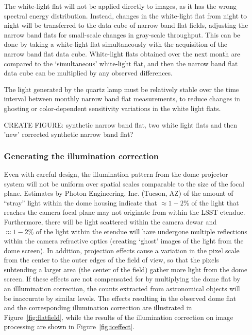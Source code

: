 \documentclass[12pt,preprint]{aastex}
\begin{document}
The white-light flat will not be applied directly to images, as it has
the wrong spectral energy distribution. Instead, changes in the
white-light flat from night to night will be transferred to the data
cube of narrow band flat fields, adjusting the narrow band flats for
small-scale changes in gray-scale throughput. This can be done by taking a
white-light flat simultaneously with the acquisition of the narrow
band flat data cube. White-light flats obtained over the next month
are compared to the `simultaneous' white-light flat, and then the
narrow band flat data cube can be multiplied by any observed differences.

The light generated by the quartz lamp must be relatively stable over
the time interval between monthly narrow band flat measurements, to
reduce changes in ghosting or color-dependent sensitivity variations
in the white light flats.

CREATE FIGURE: synthetic narrow band flat, two white light flats and then 'new'
corrected synthetic narrow band flat?

\subsubsection{Generating the illumination correction}

Even with careful design, the illumination pattern from the dome
projector system will not be uniform over spatial scales comparable to
the size of the focal plane. Estimates by Photon Engineering,
Inc. (Tucson, AZ) of the amount of ``stray'' light within the dome
housing indicate that $\approx 1−2\%$ of the light that reaches the
camera focal plane may not originate from within the LSST etendue.
Furthermore, there will be light scattered within the camera dewar and
$\approx 1-2\%$ of the light within the etendue will have undergone
multiple reflections within the camera refractive optics (creating
`ghost' images of the light from the dome screen). In addition,
projection effects cause a variation in the pixel scale from the
center to the outer edges of the field of view, so that the pixels
subtending a larger area (the center of the field) gather more light
from the dome screen. If these effects are not compensated for by
multiplying the dome flat by an illlumination correction, the counts
extracted from astronomical objects will be inaccurate by similar
levels. The effects resulting in the observed dome flat and the
corresponding illumination correction are illustrated in
Figure~\ref{fig:flatfield}, while the results of the illumination
correction on image processing are shown in
Figure~\ref{fig:iceffect}. 
\end{document}
